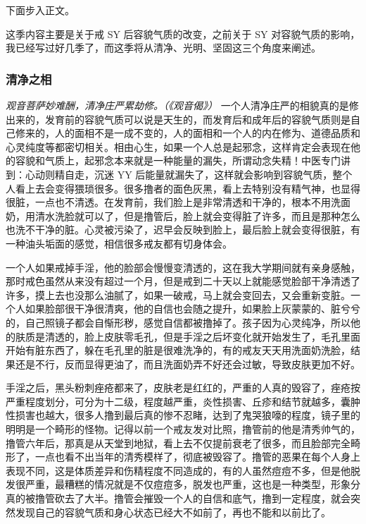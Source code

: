 下面步入正文。

这季内容主要是关于戒 SY 后容貌气质的改变，之前关于 SY 对容貌气质的影响，我已经写过好几季了，而这季将从清净、光明、坚固这三个角度来阐述。

\subsubsection{清净之相}

\textit{观音菩萨妙难酬，清净庄严累劫修。（《观音偈》）} 一个人清净庄严的相貌真的是修出来的，发育前的容貌气质可以说是天生的，而发育后和成年后的容貌气质则是自己修来的，人的面相不是一成不变的，人的面相和一个人的内在修为、道德品质和心灵纯度等都密切相关。相由心生，如果一个人总是起邪念，这样肯定会表现在他的容貌和气质上，起邪念本来就是一种能量的漏失，所谓动念失精！中医专门讲到：心动则精自走，沉迷 YY 后能量就漏失了，这样就会影响到容貌气质，整个人看上去会变得猥琐很多。很多撸者的面色灰黑，看上去特别没有精气神，也显得很脏，一点也不清透。在发育前，我们脸上是非常清透和干净的，根本不用洗面奶，用清水洗脸就可以了，但是撸管后，脸上就会变得脏了许多，而且是那种怎么也洗不干净的脏。心灵被污染了，迟早会反映到脸上，最后脸上就会变得很脏，有一种油头垢面的感觉，相信很多戒友都有切身体会。

一个人如果戒掉手淫，他的脸部会慢慢变清透的，这在我大学期间就有亲身感触，那时戒色虽然从来没有超过一个月，但是戒到二十天以上就能感觉脸部干净清透了许多，摸上去也没那么油腻了，如果一破戒，马上就会变回去，又会重新变脏。一个人如果脸部很干净很清爽，他的自信也会随之提升，如果脸上灰蒙蒙的、脏兮兮的，自己照镜子都会自惭形秽，感觉自信都被撸掉了。孩子因为心灵纯净，所以他的肤质是清透的，脸上皮肤零毛孔，但是手淫之后坏变化就开始发生了，毛孔里面开始有脏东西了，躲在毛孔里的脏是很难洗净的，有的戒友天天用洗面奶洗脸，结果还是不行，反而显得更油了，而且洗面奶弄不好还会过敏，导致皮肤更加不好。

手淫之后，黑头粉刺痤疮都来了，皮肤老是红红的，严重的人真的毁容了，痤疮按严重程度划分，可分为十二级，程度越严重，炎性损害、丘疹和结节就越多，囊肿性损害也越大，很多人撸到最后真的惨不忍睹，达到了鬼哭狼嚎的程度，镜子里的明明是一个畸形的怪物。记得以前一个戒友发对比照，撸管前的他是清秀帅气的，撸管六年后，那真是从天堂到地狱，看上去不仅提前衰老了很多，而且脸部完全畸形了，一点也看不出当年的清秀模样了，彻底被毁容了。撸管的恶果在每个人身上表现不同，这是体质差异和伤精程度不同造成的，有的人虽然痘痘不多，但是他脱发很严重，最糟糕的情况就是不仅痘痘多，脱发也严重，这也是一种类型，形象分真的被撸管砍去了大半。撸管会摧毁一个人的自信和底气，撸到一定程度，就会突然发现自己的容貌气质和身心状态已经大不如前了，再也不能和以前比了。

